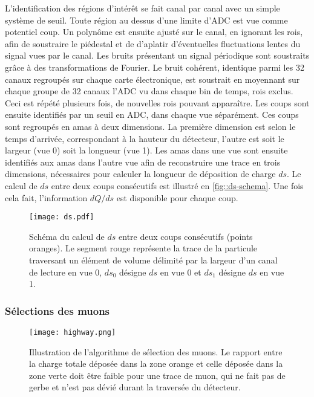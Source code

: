         L'identification des régions d'intérêt se fait canal par canal avec un simple  système de seuil. Toute région au dessus d'une limite d'ADC est vue comme potentiel coup. Un polynôme est ensuite ajusté sur le canal, en ignorant les \glspl{roi}, afin de soustraire le piédestal et de d'aplatir d'éventuelles fluctuations lentes du signal vues par le canal. Les bruits présentant un signal périodique sont soustraits grâce à des transformations de Fourier. Le bruit cohérent, identique parmi les 32 canaux regroupés sur chaque carte électronique, est soustrait en moyennant sur chaque groupe de 32 canaux l'ADC vu dans chaque bin de temps, \glspl{roi} exclus. Ceci est répété plusieurs fois, de nouvelles \glspl{roi} pouvant apparaître. Les coups sont ensuite identifiés par un seuil en ADC, dans chaque vue séparément. Ces coups sont regroupés en amas à deux dimensions. La première dimension est selon le temps d'arrivée, correspondant à la hauteur du détecteur, l'autre est soit le largeur (vue 0) soit la longueur (vue 1). Les amas dans une vue sont ensuite identifiés aux amas dans l'autre vue afin de reconstruire une trace en trois dimensions, nécessaires pour calculer la longueur de déposition de charge $ds$. Le calcul de $ds$ entre deux coups consécutifs est illustré en \autoref{fig::ds-schema}. Une fois cela fait, l'information $dQ/ds$ est disponible pour chaque coup.

        \begin{figure}[htbp]
          \centering
          \texttt{[image: ds.pdf]}
          \caption[Schéma du calcul de $ds$]{\label{fig::ds-schema}Schéma du calcul de $ds$ entre deux coups consécutifs (points oranges). Le segment rouge représente la trace de la particule traversant un élément de volume délimité par la largeur d'un canal de lecture en vue 0, $ds_0$ désigne $ds$ en vue 0 et $ds_1$ désigne $ds$ en vue 1.}
        \end{figure}

      \subsubsection{Sélections des muons}\label{sec::selection}

        \begin{figure}[htbp]
          \centering
          \texttt{[image: highway.png]}
          \caption[Illustration de l'algorithme de sélection des muons]{\label{fig::highway}Illustration de l'algorithme de sélection des muons. Le rapport entre la charge totale déposée dans la zone orange et celle déposée dans la zone verte doit être faible pour une trace de muon, qui ne fait pas de gerbe et n'est pas dévié durant la traversée du détecteur.}
        \end{figure}


